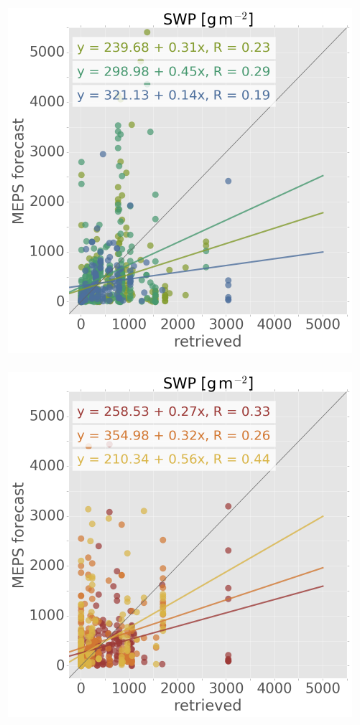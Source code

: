 \begin{figure}[!b]
	\centering
	\begin{subfigure}[b]{0.49\textwidth}
		\includegraphics[width=\textwidth]{./fig_SWP_scat/EM09_20161221_23_00}
		\caption{}\label{fig:SWP:2123}
	\end{subfigure}
	\begin{subfigure}[b]{0.49\textwidth}
		\includegraphics[width=\textwidth]{./fig_SWP_scat/EM09_20161224_26_00}

\end{subfigure}
\end{figure}
